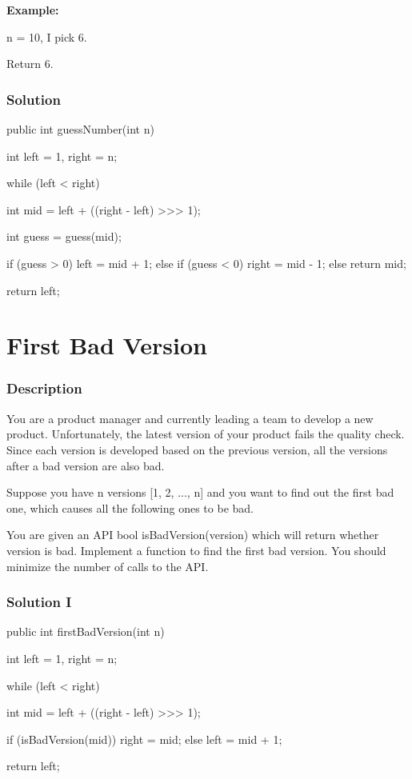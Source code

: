 \textbf{Example:}

n = 10, I pick 6.

Return 6.

\subsubsection{Solution}

\begin{Code}
public int guessNumber(int n) {
    int left = 1, right = n;

    while (left < right) {
        int mid = left + ((right - left) >>> 1);

        int guess = guess(mid);

        if (guess > 0) {
            left = mid + 1;
        } else if (guess < 0) {
            right = mid - 1;
        } else {
            return mid;
        }
    }

    return left;
}
\end{Code}

\newpage

\section{First Bad Version} %

\subsubsection{Description}
You are a product manager and currently leading a team to develop a new product. Unfortunately, the latest version of your product fails the quality check. Since each version is developed based on the previous version, all the versions after a bad version are also bad.

Suppose you have n versions [1, 2, ..., n] and you want to find out the first bad one, which causes all the following ones to be bad.

You are given an API bool isBadVersion(version) which will return whether version is bad. Implement a function to find the first bad version. You should minimize the number of calls to the API.

\subsubsection{Solution I}

\begin{Code}
public int firstBadVersion(int n) {
    int left = 1, right = n;

    while (left < right) {
        int mid = left + ((right - left) >>> 1);

        if (isBadVersion(mid)) {
            right = mid;
        } else {
            left = mid + 1;
        }
    }

    return left;
}
\end{Code}

